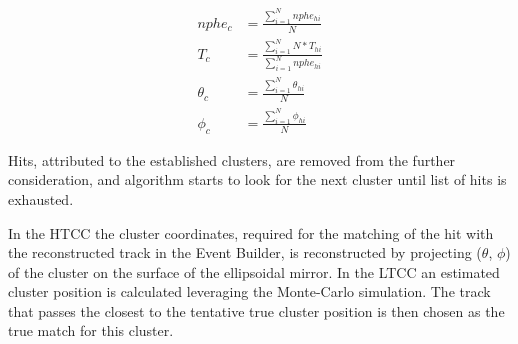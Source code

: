 \begin{eqnarray*}
nphe_c &= \frac{\sum_{i=1}^{N}{nphe_{hi}}}{N}\\
T_c &= \frac{\sum_{i=1}^{N}{N*T_{hi}}}{\sum_{i=1}^{N}{nphe_{hi}}}\\
\theta_c &=\frac{\sum_{i=1}^{N}{\theta_{hi}}}{N}\\
\phi_c &= \frac{\sum_{i=1}^{N}{\phi_{hi}}}{N}
\end{eqnarray*}

Hits, attributed to the established clusters, are removed from the further consideration, and algorithm starts to
look for the next cluster until list of hits is exhausted.

In the HTCC the cluster coordinates, required for the matching of the hit with the reconstructed track in the Event Builder, is
reconstructed by projecting  ($\theta$, $\phi$) of the cluster on the surface of the ellipsoidal mirror.     In the LTCC an estimated cluster
position is calculated leveraging the Monte-Carlo simulation.  The track that passes the closest to the tentative true cluster position is then chosen as the true match for this cluster.

